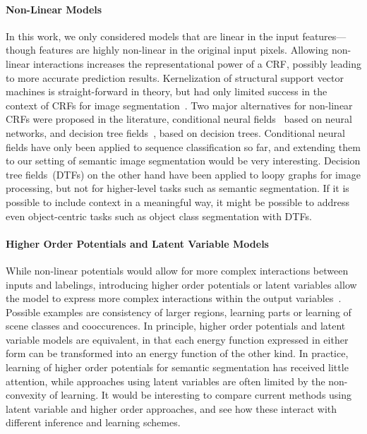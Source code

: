 \documentclass[12pt,toc=bibnumbered, a4paper,twoside,DIV=11,BCOR=.5cm]{scrbook}
\begin{document}
\paragraph{Non-Linear Models}
In this work, we only considered models that are linear in the input features---though
features are highly non-linear in the original input pixels. Allowing non-linear
interactions increases the representational power of a CRF, possibly leading
to more accurate prediction results.
Kernelization of structural support vector machines is straight-forward in theory, but
had only limited success in the context of CRFs for image
segmentation~\citep{lucchi2012structured}.
Two major alternatives for non-linear CRFs were proposed in the literature,
conditional neural fields~\citep{peng2009conditional} based on neural networks,
and decision tree fields~\citep{nowozin2011decision}, based on decision trees.
Conditional neural fields have only been applied to sequence classification so far,
and extending them to our setting of semantic image segmentation would be very
interesting. Decision tree fields~(DTFs) on the other hand have been applied to loopy
graphs for image processing, but not for higher-level tasks such as semantic
segmentation. If it is possible to include context in a meaningful way, it
might be possible to address even object-centric tasks such as object class
segmentation with DTFs.

\paragraph{Higher Order Potentials and Latent Variable Models}
While non-linear potentials would allow for more complex interactions between
inputs and labelings, introducing higher order potentials or latent variables
allow the model to express more complex interactions within the output
variables~\citep{dann2012pottics, kohli2009robust}. Possible examples are
consistency of larger regions, learning parts or learning of scene classes and
cooccurences.
In principle, higher order potentials and latent variable models are
equivalent, in that each energy function expressed in either form can be
transformed into an energy function of the other kind. In practice, learning of
higher order potentials for semantic segmentation has received little
attention, while approaches using latent variables are often limited by
the non-convexity of learning.  It would be interesting to compare current
methods using latent variable and higher order approaches, and see how these
interact with different inference and learning schemes.
\end{document}
